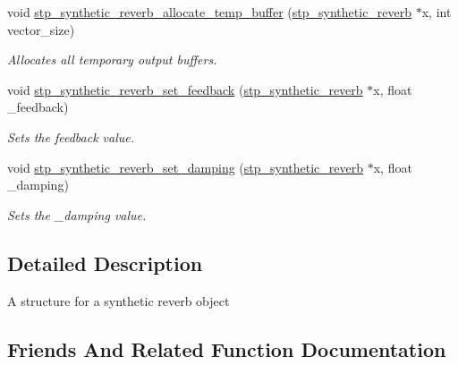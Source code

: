 \begin{DoxyCompactItemize}
\begin{DoxyCompactList}
 \end{DoxyCompactList}\item 
void \hyperlink{structstp__synthetic__reverb_a2b1a7dfa54d7e6a903b2496e5319e2ab}{stp\+\_\+synthetic\+\_\+reverb\+\_\+allocate\+\_\+temp\+\_\+buffer} (\hyperlink{structstp__synthetic__reverb}{stp\+\_\+synthetic\+\_\+reverb} $\ast$x, int vector\+\_\+size)
\begin{DoxyCompactList}\small\item\em Allocates all temporary output buffers. ~\newline
 \end{DoxyCompactList}\item 
void \hyperlink{structstp__synthetic__reverb_a694e51a0e4f29ccc542ea24ec8ce7dd9}{stp\+\_\+synthetic\+\_\+reverb\+\_\+set\+\_\+feedback} (\hyperlink{structstp__synthetic__reverb}{stp\+\_\+synthetic\+\_\+reverb} $\ast$x, float \+\_\+feedback)
\begin{DoxyCompactList}\small\item\em Sets the feedback value. ~\newline
 \end{DoxyCompactList}\item 
void \hyperlink{structstp__synthetic__reverb_a1ef4da6c52500e6ff28cf5ada997fee0}{stp\+\_\+synthetic\+\_\+reverb\+\_\+set\+\_\+damping} (\hyperlink{structstp__synthetic__reverb}{stp\+\_\+synthetic\+\_\+reverb} $\ast$x, float \+\_\+damping)
\begin{DoxyCompactList}\small\item\em Sets the \+\_\+damping value. ~\newline
 \end{DoxyCompactList}\end{DoxyCompactItemize}


\subsection{Detailed Description}
A structure for a synthetic reverb object ~\newline
 

\subsection{Friends And Related Function Documentation}
\mbox{\label{structstp__synthetic__reverb_a2b1a7dfa54d7e6a903b2496e5319e2ab}} 
